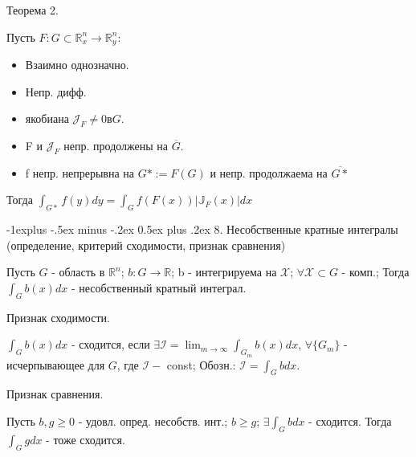 \documentclass[unicode,10pt, landscape]{article}
\makeatletter
\renewcommand{\subsection}{\@startsection{subsection}{2}{0mm}%
                                {-1explus -.5ex minus -.2ex}%
                                {0.5ex plus .2ex}%
                                {\normalfont\normalsize\bfseries}}
\makeatother
\begin{document}
\begin{multicols}{4}
Теорема 2.
\begin{Th}
Пусть $F: G \subset \mathbb{R}^n_x \to \mathbb{R}^n_y$:
\begin{itemize}
\item Взаимно однозначно.
\item Непр. дифф.
\item якобиана $\mathcal{J}_F \neq 0 в G$.
\item F и $\mathcal{J}_F$ непр. продолжены на $\overline{G}$.
\item f непр. непрерывна на $G* := F(G)$ и непр. продолжаема на $\overline{G*}$
\end{itemize}
Тогда $\int_{G*}f(y)dy = \int_{G}f(F(x))|\mathbb{J}_F(x)|dx$
\end{Th}


\subsection{8. Несобственные кратные интегралы (определение, критерий сходимости, признак сравнения)}
\begin{Def}
Пусть $G$ - область в $\mathbb{R}^n$; $b: G \to \mathbb{R}$; b - интегрируема на $\mathcal{X}$; $\forall \mathcal{X} \subset G$ - комп.; Тогда $\int_G b(x)dx$ - несобственный кратный интеграл.
\end{Def}
Признак сходимости.
\begin{Def}
$\int_G b(x)dx$ - сходится, если $\exists \mathcal{I} = \lim_{m \to \infty} \int_{G_m}b(x)dx$, $\forall\{ G_m \}$ - исчерпывающее для $G$, где $\mathcal{I} - $ const; Обозн.: $\mathcal{I} = \int_G bdx$.
\end{Def}
Признак сравнения.
\begin{Th}
Пусть $b, g \geq 0$ - удовл. опред. несобств. инт.; $b \geq g$; $\exists \int_G bdx$ - сходится. Тогда $\int_G gdx$ - тоже сходится.
\end{Th}



\end{multicols}
\end{document}
